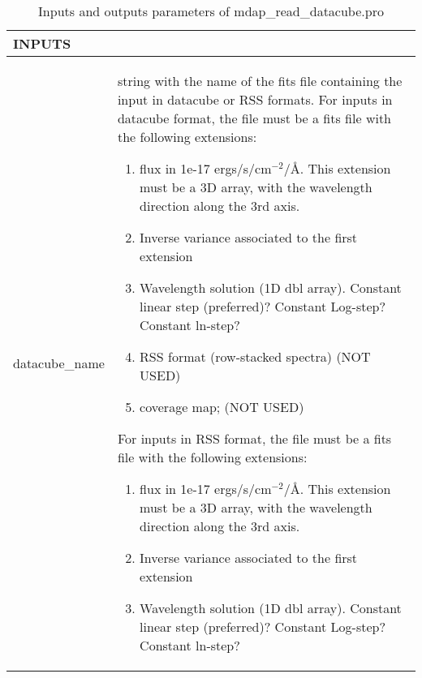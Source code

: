 \begin{center}
\begin{longtable}{p{2.7cm}| p{11.1cm}}
\caption{Inputs and outputs parameters of mdap\_read\_datacube.pro} \label{dap_tab:mdap_read_datacube} \\
\hline
{\bf  INPUTS} & \\
\hline
\endfirsthead
\hline
\endhead
\hline
\endlastfoot
\hline
datacube\_name & string with the name of the fits file containing the input in datacube or RSS formats. 
                         For inputs in datacube format, the file must be a fits file with the following
                         extensions:
                                \begin{enumerate}
                             \item flux in 1e-17 ergs/s/cm$^{-2}$/\AA. This extension must be a 3D
                               array, with the wavelength direction along the 3rd axis. 
                            \item  Inverse variance associated to the first extension
                            \item  Wavelength solution (1D dbl array). Constant linear step
                              (preferred)? Constant Log-step? Constant ln-step?
                            \item  RSS format (row-stacked spectra) (NOT USED)                  
                            \item  coverage map; (NOT USED)
                           \end{enumerate}

                         For inputs in RSS format, the file must be a fits file with the following
                         extensions:
                          \begin{enumerate}
                            \item flux in 1e-17 ergs/s/cm$^{-2}$/\AA. This extension must be a 3D
                               array, with the wavelength direction along the 3rd axis.
 
                            \item Inverse variance associated to the first extension

                            \item Wavelength solution (1D dbl array). Constant linear step
                              (preferred)? Constant Log-step? Constant ln-step?
                            

\end{enumerate}
\end{longtable}
\end{center}
